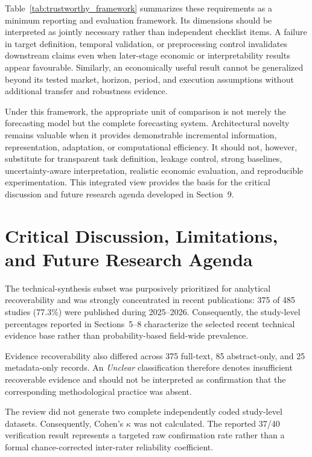 \documentclass[pdflatex,sn-mathphys-num]{sn-jnl}%
\theoremstyle{thmstyleone}%
\theoremstyle{thmstyletwo}%
\theoremstyle{thmstylethree}%
\begin{document}
Table~\ref{tab:trustworthy_framework} summarizes these
requirements as a minimum reporting and evaluation framework. Its dimensions should be interpreted as jointly necessary rather than
independent checklist items. A failure in target definition, temporal validation,
or preprocessing control invalidates downstream claims even when later-stage
economic or interpretability results appear favourable. Similarly, an
economically useful result cannot be generalized beyond its tested market,
horizon, period, and execution assumptions without additional transfer and
robustness evidence.

Under this framework, the appropriate unit of comparison is not merely the
forecasting model but the complete forecasting system. Architectural novelty
remains valuable when it provides demonstrable incremental information,
representation, adaptation, or computational efficiency. It should not,
however, substitute for transparent task definition, leakage control, strong
baselines, uncertainty-aware interpretation, realistic economic evaluation, and
reproducible experimentation. This integrated view provides the basis for the
critical discussion and future research agenda developed in Section~9.

\section{Critical Discussion, Limitations, and Future Research Agenda}
\label{sec:critical-discussion}


The technical-synthesis subset was purposively prioritized for analytical
recoverability and was strongly concentrated in recent publications:
375 of 485 studies (77.3\%) were published during 2025--2026.
Consequently, the study-level percentages reported in Sections~5--8
characterize the selected recent technical evidence base rather than
probability-based field-wide prevalence.

Evidence recoverability also differed across 375 full-text, 85 abstract-only,
and 25 metadata-only records. An \emph{Unclear} classification therefore
denotes insufficient recoverable evidence and should not be interpreted as
confirmation that the corresponding methodological practice was absent.

The review did not generate two complete independently coded study-level
datasets. Consequently, Cohen's \(\kappa\) was not calculated. The reported
37/40 verification result represents a targeted raw confirmation rate rather
than a formal chance-corrected inter-rater reliability coefficient.
\end{document}
